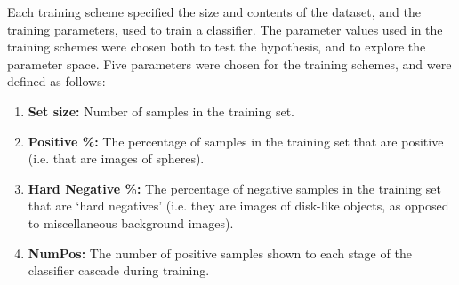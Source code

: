 \documentclass{sig-alternate-05-2015}
\newcommand{\scarequotes}[1]{`#1'}
\newcommand{\newterm}[1]{{\textit{#1}}}
\newcommand{\citep}[1]{\cite{#1}}
\begin{document}
{		Each training scheme specified the size and contents of the dataset, and the training parameters, used to train a classifier.
		The parameter values used in the training schemes were chosen both to test the hypothesis, and to explore the parameter space.
		Five parameters were chosen for the training schemes, and were defined as follows:

		\begin{enumerate}
			\item{\textbf{Set size:}} Number of samples in the training set.
			\item{\textbf{Positive \%:}} The percentage of samples in the training set that are positive (i.e. that are images of spheres).
			\item{\textbf{Hard Negative \%:}} The percentage of negative samples in the training set that are \scarequotes{hard negatives} (i.e. they are images of disk-like objects, as opposed to miscellaneous background images).
			\item{\textbf{NumPos:}} The number of positive samples shown to each stage of the classifier cascade during training.
		\end{enumerate}

}
\end{document}
